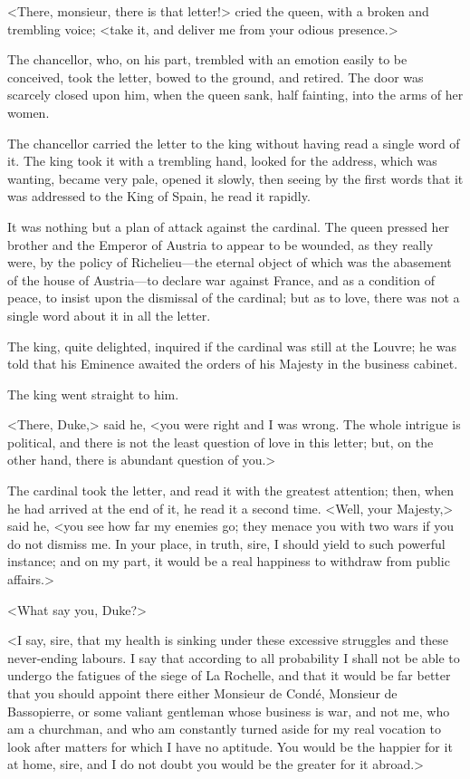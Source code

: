 <There, monsieur, there is that letter!> cried the queen, with a broken and trembling voice; <take it, and deliver me from your odious presence.> 

The chancellor, who, on his part, trembled with an emotion easily to be conceived, took the letter, bowed to the ground, and retired. The door was scarcely closed upon him, when the queen sank, half fainting, into the arms of her women. 

The chancellor carried the letter to the king without having read a single word of it. The king took it with a trembling hand, looked for the address, which was wanting, became very pale, opened it slowly, then seeing by the first words that it was addressed to the King of Spain, he read it rapidly. 

It was nothing but a plan of attack against the cardinal. The queen pressed her brother and the Emperor of Austria to appear to be wounded, as they really were, by the policy of Richelieu—the eternal object of which was the abasement of the house of Austria—to declare war against France, and as a condition of peace, to insist upon the dismissal of the cardinal; but as to love, there was not a single word about it in all the letter. 

The king, quite delighted, inquired if the cardinal was still at the Louvre; he was told that his Eminence awaited the orders of his Majesty in the business cabinet. 

The king went straight to him. 

<There, Duke,> said he, <you were right and I was wrong. The whole intrigue is political, and there is not the least question of love in this letter; but, on the other hand, there is abundant question of you.> 

The cardinal took the letter, and read it with the greatest attention; then, when he had arrived at the end of it, he read it a second time. <Well, your Majesty,> said he, <you see how far my enemies go; they menace you with two wars if you do not dismiss me. In your place, in truth, sire, I should yield to such powerful instance; and on my part, it would be a real happiness to withdraw from public affairs.> 

<What say you, Duke?> 

<I say, sire, that my health is sinking under these excessive struggles and these never-ending labours. I say that according to all probability I shall not be able to undergo the fatigues of the siege of La Rochelle, and that it would be far better that you should appoint there either Monsieur de Condé, Monsieur de Bassopierre, or some valiant gentleman whose business is war, and not me, who am a churchman, and who am constantly turned aside for my real vocation to look after matters for which I have no aptitude. You would be the happier for it at home, sire, and I do not doubt you would be the greater for it abroad.> 

